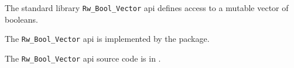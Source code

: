
The standard library {\tt Rw\_Bool\_Vector} api defines access to a mutable vector of booleans.

The {\tt  Rw\_Bool\_Vector} api is implemented by the  package.

The {\tt Rw\_Bool\_Vector} api source code is in .





